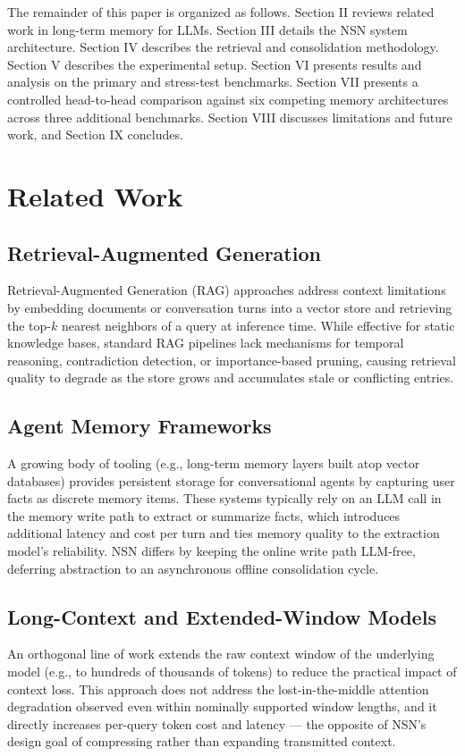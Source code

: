 \documentclass[conference]{IEEEtran}
\begin{document}
The remainder of this paper is organized as follows. Section II reviews related work in long-term memory for LLMs. Section III details the NSN system architecture. Section IV describes the retrieval and consolidation methodology. Section V describes the experimental setup. Section VI presents results and analysis on the primary and stress-test benchmarks. Section VII presents a controlled head-to-head comparison against six competing memory architectures across three additional benchmarks. Section VIII discusses limitations and future work, and Section IX concludes.

\section{Related Work}

\subsection{Retrieval-Augmented Generation}
Retrieval-Augmented Generation (RAG) approaches address context limitations by embedding documents or conversation turns into a vector store and retrieving the top-$k$ nearest neighbors of a query at inference time. While effective for static knowledge bases, standard RAG pipelines lack mechanisms for temporal reasoning, contradiction detection, or importance-based pruning, causing retrieval quality to degrade as the store grows and accumulates stale or conflicting entries.

\subsection{Agent Memory Frameworks}
A growing body of tooling (e.g., long-term memory layers built atop vector databases) provides persistent storage for conversational agents by capturing user facts as discrete memory items. These systems typically rely on an LLM call in the memory write path to extract or summarize facts, which introduces additional latency and cost per turn and ties memory quality to the extraction model's reliability. NSN differs by keeping the online write path LLM-free, deferring abstraction to an asynchronous offline consolidation cycle.

\subsection{Long-Context and Extended-Window Models}
An orthogonal line of work extends the raw context window of the underlying model (e.g., to hundreds of thousands of tokens) to reduce the practical impact of context loss. This approach does not address the lost-in-the-middle attention degradation observed even within nominally supported window lengths, and it directly increases per-query token cost and latency --- the opposite of NSN's design goal of compressing rather than expanding transmitted context.
\end{document}
